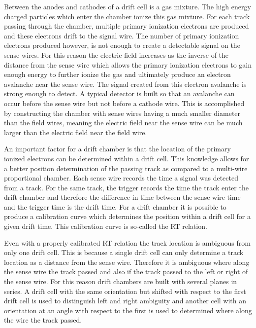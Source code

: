 Between the anodes and cathodes of a drift cell is a gas mixture.  The high
energy charged particles which enter the chamber ionize this gas mixture.  For
each track passing through the chamber, multiple primary ionization electrons
are produced and these electrons drift to the signal wire.  The number of
primary ionization electrons produced however, is not enough to create a
detectable signal on the sense wires.  For this reason the electric field
increases as the inverse of the distance from the sense wire which allows the
primary ionization electrons to gain enough energy to further ionize the gas and
ultimately produce an electron avalanche near the sense wire.  The signal
created from this electron avalanche is strong enough to detect.  A typical
detector is built so that an avalanche can occur before the sense wire but not
before a cathode wire.  This is accomplished by constructing the chamber with
sense wires having a much smaller diameter than the field wires, meaning the
electric field near the sense wire can be much larger than the electric field
near the field wire.

An important factor for a drift chamber is that the location of the primary
ionized electrons can be determined within a drift cell.  This knowledge allows
for a better position determination of the passing track as compared to a
multi-wire proportional chamber.  Each sense wire records the time a signal was
detected from a track.  For the same track, the trigger records the time the
track enter the drift chamber and therefore the difference in time between the
sense wire time and the trigger time is the drift time.  For a drift chamber it
is possible to produce a calibration curve which determines the position within
a drift cell for a given drift time.  This calibration curve is so-called the RT
relation.

Even with a properly calibrated RT relation the track location is ambiguous from
only one drift cell.  This is because a single drift cell can only determine a
track location as a distance from the sense wire.  Therefore it is ambiguous
where along the sense wire the track passed and also if the track passed to the
left or right of the sense wire.  For this reason drift chambers are built with
several planes in series.  A drift cell with the same orientation but shifted
with respect to the first drift cell is used to distinguish left and right
ambiguity and another cell with an orientation at an angle with respect to the
first is used to determined where along the wire the track passed.


